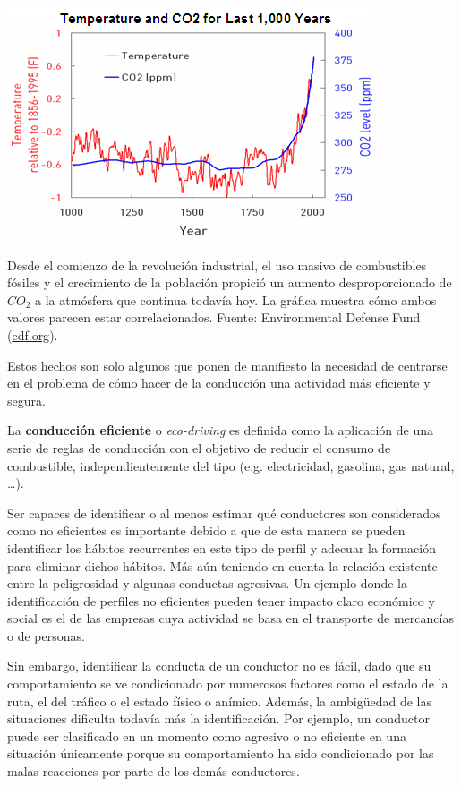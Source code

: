 \begin{marginfigure}
	\includegraphics[width=\linewidth]{images/co2-global-warm-correlation}
	\caption{Desde el comienzo de la revolución industrial, el uso masivo de combustibles fósiles y el crecimiento de la población propició un aumento desproporcionado de $CO_2$ a la atmósfera que continua todavía hoy. La gráfica muestra cómo ambos valores parecen estar correlacionados. Fuente: Environmental Defense Fund (\url{edf.org}).}
	\label{fig:co2-global-warm-correlation}
\end{marginfigure}

Estos hechos son solo algunos que ponen de manifiesto la necesidad de centrarse en el problema de cómo hacer de la conducción una actividad más eficiente y segura.

La \textbf{conducción eficiente} o \textit{eco-driving} es definida como la aplicación de una serie de reglas de conducción con el objetivo de reducir el consumo de combustible, independientemente del tipo (e.g. electricidad, gasolina, gas natural, \ldots).

Ser capaces de identificar o al menos estimar qué conductores son considerados como no eficientes es importante debido a que de esta manera se pueden identificar los hábitos recurrentes en este tipo de perfil y adecuar la formación para eliminar dichos hábitos. Más aún teniendo en cuenta la relación existente entre la peligrosidad y algunas conductas agresivas. Un ejemplo donde la identificación de perfiles no eficientes pueden tener impacto claro económico y social es el de las empresas cuya actividad se basa en el transporte de mercancías o de personas.

Sin embargo, identificar la conducta de un conductor no es fácil, dado que su comportamiento se ve condicionado por numerosos factores como el estado de la ruta, el del tráfico o el estado físico o anímico. Además, la ambigüedad de las situaciones dificulta todavía más la identificación. Por ejemplo, un conductor puede ser clasificado en un momento como agresivo o no eficiente en una situación únicamente porque su comportamiento ha sido condicionado por las malas reacciones por parte de los demás conductores.

